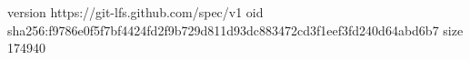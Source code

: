 version https://git-lfs.github.com/spec/v1
oid sha256:f9786e0f5f7bf4424fd2f9b729d811d93dc883472cd3f1eef3fd240d64abd6b7
size 174940
